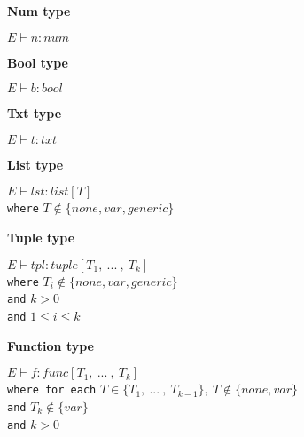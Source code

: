 \textbf{Num type}\\
\begin{center}
	\begin{math}
		E \vdash n : num
	\end{math}
\end{center}

\textbf{Bool type}\\
\begin{center}
	\begin{math}
	E \vdash b : bool
	\end{math}
\end{center}

\textbf{Txt type}\\
\begin{center}
	\begin{math}
	E \vdash t : txt
	\end{math}
\end{center}

\textbf{List type}\\
\begin{center}
	\begin{math}
	E \vdash lst : list[T]
	\end{math}
	\\[1\baselineskip]
	\texttt{where} $T \notin \{none, var, generic\}$
\end{center}

\textbf{Tuple type}\\
\begin{center}
	\begin{math}
	E \vdash tpl : tuple[T_1, \ .
	.
	.
	\ ,\ T_k]
	\end{math}
	\\[1\baselineskip]
	\texttt{where} $T_i \notin \{none, var, generic\}$\\
	\texttt{and} $k > 0$\\
	\texttt{and} $1 \le i \le k$
\end{center}

\textbf{Function type}\\
\begin{center}
	\begin{math}
	E \vdash f : func[T_1,\ .
	.
	.
	\ ,\ T_k]
	\end{math}
	\\[1\baselineskip]
	\texttt{where for each} $T \in \{T_1,\ .
	.
	.
	\ ,\ T_{k-1}\},\ T \notin \{none, var\}$\\
	\texttt{and} $T_k \notin \{var\}$\\
	\texttt{and} $k > 0$
\end{center}

